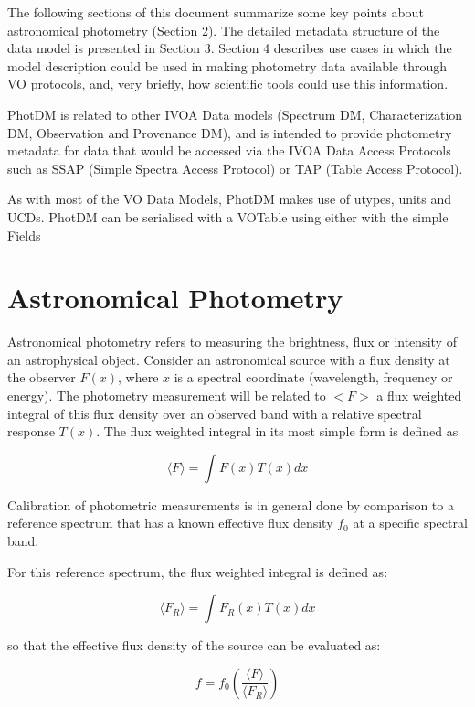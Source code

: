 \documentclass[11pt,a4paper]{ivoa}
\begin{document}
The following sections of this document summarize some key points 
about astronomical photometry (Section 2). The detailed metadata 
structure of the data model is presented in Section 3. Section 4 
describes use cases in which the model description could be used in 
making photometry data available through VO protocols, and, very briefly, 
how scientific tools could use this information.


PhotDM is related to other IVOA Data models (Spectrum DM, Characterization DM, 
Observation and Provenance DM),  and is intended to provide photometry 
metadata for data that would be accessed via the IVOA Data Access Protocols 
such as SSAP (Simple Spectra Access Protocol) or TAP (Table Access Protocol).

As with most of the VO Data Models, PhotDM makes use of utypes, units 
and UCDs. PhotDM can be serialised with a VOTable using  either with the simple Fields 

\section{Astronomical Photometry}
Astronomical photometry refers to measuring the brightness, flux or 
intensity of an astrophysical object. Consider an astronomical source 
with a flux density at the observer $F(x)$, where $x$ is a spectral coordinate 
(wavelength, frequency or energy).  The photometry measurement will be related 
to $<F>$ a flux weighted integral of this flux density over an observed band 
with a relative spectral response $T(x)$. The flux weighted integral in its most 
simple form is defined as

\begin{equation} \label{eq:1}
\langle F\rangle = \int F(x)T(x)dx 
\end{equation}

Calibration of photometric measurements is in general done by comparison to a 
reference spectrum that has a known effective flux density $f_0$ at a specific 
spectral band.


For this reference spectrum, the flux weighted integral is defined as:

\begin{equation} \label{eq:2}
\langle F_R \rangle= \int F_R (x)T(x)dx 
\end{equation}


so that the effective flux density of the source can be evaluated as:

\begin{equation} \label{eq:3}
f = f_0 ( \frac{\langle F\rangle }{\langle F_R \rangle } ) 
\end{equation}
\end{document}
